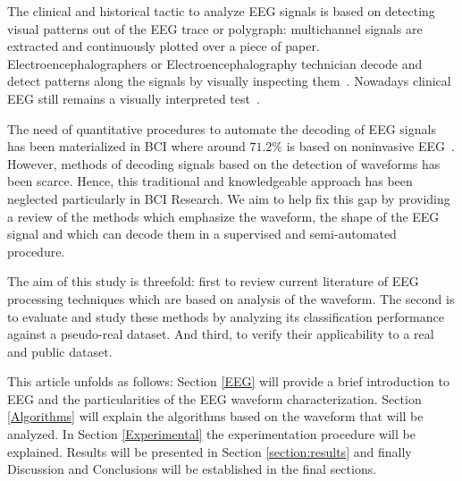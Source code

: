 \documentclass[brainsci,article,submit,moreauthors,pdftex,10pt,a4paper]{mdpi}
\begin{document}
The clinical and historical tactic to analyze EEG signals is based on detecting visual patterns out of the EEG trace or polygraph\citep{Hartman2005}: multichannel signals are extracted and continuously plotted over a piece of paper. Electroencephalographers or Electroencephalography technician decode and detect patterns along the signals by visually inspecting them~\citep{Schomer2010}.   Nowadays clinical EEG still remains a visually interpreted test~\citep{Hartman2005}.


The need of quantitative procedures to automate the decoding of EEG signals has been materialized in BCI where around $71.2\%$ is based on noninvasive EEG~\citep{Guger2017}.  However, methods of decoding signals based on the detection of waveforms has been scarce. Hence, this traditional and knowledgeable approach has been neglected particularly in BCI Research. We aim to help fix this gap by providing a review of the methods which emphasize the waveform, the shape of the EEG signal and which can decode them in a supervised and semi-automated procedure.

The aim of this study is threefold: first to review current literature of EEG processing techniques which are based on analysis of the waveform.  The second is to evaluate and study these methods by analyzing its classification performance against a pseudo-real dataset. And third, to verify their applicability to a real and public dataset.  


This article unfolds as follows: Section \ref{EEG} will provide a brief introduction to EEG and the particularities of the EEG waveform characterization.  Section \ref{Algorithms} will explain the algorithms based on the waveform that will be analyzed.  In Section \ref{Experimental} the experimentation procedure will be explained.  Results will be presented in Section \ref{section:results} and finally Discussion and Conclusions will be established in the final sections.
\end{document}
